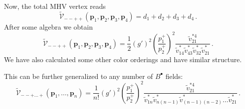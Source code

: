 \documentclass[english,american]{article}
\begin{document}
Now, the total MHV vertex reads
\begin{equation}
\tilde{\mathcal{V}}_{--++}\left(\mathbf{p}_{1},\mathbf{p}_{2},\mathbf{p}_{3},\mathbf{p}_{4}\right)=d_{1}+d_{2}+d_{3}+d_{4}\,.
\end{equation}
After some algebra we obtain
\begin{equation}
\tilde{\mathcal{V}}_{--++}\left(\mathbf{p}_{1},\mathbf{p}_{2},\mathbf{p}_{3},\mathbf{p}_{4}\right)=\frac{1}{2}\left(g'\right)^{2}\left(\frac{p_{1}^{+}}{p_{2}^{+}}\right)^{2}\frac{\tilde{v}_{21}^{*4}}{\tilde{v}_{14}^{*}\tilde{v}_{43}^{*}\tilde{v}_{32}^{*}\tilde{v}_{21}^{*}}\,.
\end{equation}
We have also calculated some other color orderings and have similar
structure.

This can be further generalized to any number of $B^{\bullet}$ fields:
\begin{equation}
\tilde{\mathcal{V}}_{--+\dots+}\left(\mathbf{p}_{1},\dots,\mathbf{p}_{n}\right)=\frac{1}{n!}\left(g'\right)^{2}\left(\frac{p_{1}^{+}}{p_{2}^{+}}\right)^{2}\frac{\tilde{v}_{21}^{*4}}{\tilde{v}_{1n}^{*}\tilde{v}_{n\left(n-1\right)}^{*}\tilde{v}_{\left(n-1\right)\left(n-2\right)}^{*}\dots\tilde{v}_{21}^{*}}\,.
\end{equation}




%
\end{document}
